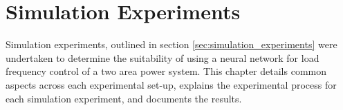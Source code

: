 \chapter{Simulation Experiments}

Simulation experiments, outlined in section \ref{sec:simulation_experiments} were undertaken to determine the suitability of using a neural network for load frequency control of a two area power system. This chapter details common aspects across each experimental set-up, explains the experimental process for each simulation experiment, and documents the results.




\newpage




\clearpage




\clearpage




\clearpage




\clearpage




\clearpage




\clearpage


